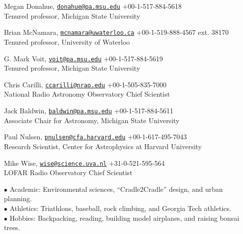 \documentclass[12pt]{cv}
\begin{document}
\begin{llist}

Megan Donahue, \href{mailto:donahue@pa.msu.edu}{\tt donahue@pa.msu.edu} \hfill +00-1-517-884-5618\\
Tenured professor, Michigan State University

Brian McNamara, \href{mailto:mcnamara@uwaterloo.ca}{\tt mcnamara@uwaterloo.ca} \hfill +00-1-519-888-4567 ext. 38170\\
Tenured professor, University of Waterloo

G. Mark Voit, \href{mailto:voit@pa.msu.edu}{\tt voit@pa.msu.edu} \hfill +00-1-517-884-5619\\
Tenured professor, Michigan State University

Chris Carilli, \href{mailto:ccarilli@nrao.edu}{\tt ccarilli@nrao.edu} \hfill +00-1-505-835-7000\\
National Radio Astronomy Observatory Chief Scientist

Jack Baldwin, \href{mailto:baldwin@pa.msu.edu}{\tt baldwin@pa.msu.edu} \hfill +00-1-517-884-5611\\
Associate Chair for Astronomy, Michigan State University

Paul Nulsen, \href{mailto:pnulsen@cfa.harvard.edu}{\tt pnulsen@cfa.harvard.edu} \hfill +00-1-617-495-7043\\
Research Scientist, Center for Astrophysics at Harvard University

Mike Wise, \href{mailto:wise@science.uva.nl}{\tt wise@science.uva.nl} \hfill +31-0-521-595-564\\
LOFAR Radio Observatory Chief Scientist


$\bullet$ Academic: Environmental sciences, ``Cradle2Cradle'' design, and urban planning.\\
$\bullet$ Athletics: Triathlons, baseball, rock climbing, and Georgia Tech athletics.\\
$\bullet$ Hobbies: Backpacking, reading, building model airplanes, and raising bonsai trees.

\end{llist}
\end{document}
